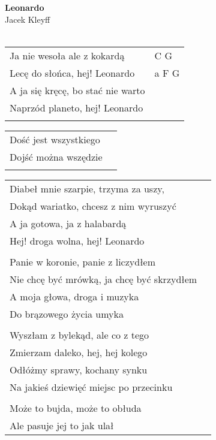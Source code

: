 \documentclass[a5paper]{article}
\begin{document}


\noindent
\fontsize{12pt}{15pt}\selectfont
\textbf{Leonardo} \\
\fontsize{8pt}{10pt}\selectfont
Jacek Kleyff \\ \\
\fontsize{10pt}{12pt}\selectfont
{}
\begin{tabular}{@{}p{7.50cm}p{3cm}@{}}
\noindent
Ja nie wesoła ale z kokardą & C G \\
Lecę do słońca, hej! Leonardo & a F G \\
A ja się kręcę, bo stać nie warto \\
Naprzód planeto, hej! Leonardo \\ \\
\end{tabular}

\noindent
\begin{tabular}{@{}p{4.00cm}p{3cm}@{}}
Dość jest wszystkiego \\
Dojść można wszędzie  \\ \\
\end{tabular}

\noindent
\begin{tabular}{@{}p{6.50cm}p{3cm}@{}}
Diabeł mnie szarpie, trzyma za uszy,  \\
Dokąd wariatko, chcesz z nim wyruszyć \\
A ja gotowa, ja z halabardą \\
Hej! droga wolna, hej! Leonardo \\ \\

Panie w koronie, panie z liczydłem\\
Nie chcę być mrówką, ja chcę być skrzydłem\\
A moja głowa, droga i muzyka\\
Do brązowego życia umyka \\ \\

Wyszłam z bylekąd, ale co z tego \\
Zmierzam daleko, hej, hej kolego\\
Odłóżmy sprawy, kochany synku\\
Na jakieś dziewięć miejsc po przecinku\\ \\

Może to bujda, może to obłuda\\
Ale pasuje jej to jak ulał
\end{tabular}
\end{document}
